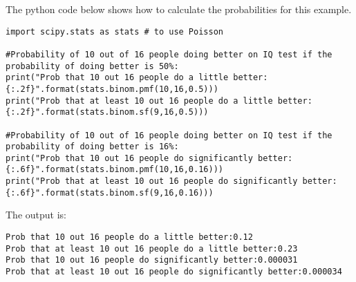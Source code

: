 The python code below shows how to calculate the probabilities for this example.
\begin{lstlisting}[frame=single] 
import scipy.stats as stats # to use Poisson

#Probability of 10 out of 16 people doing better on IQ test if the probability of doing better is 50%:
print("Prob that 10 out 16 people do a little better:{:.2f}".format(stats.binom.pmf(10,16,0.5)))
print("Prob that at least 10 out 16 people do a little better:{:.2f}".format(stats.binom.sf(9,16,0.5)))

#Probability of 10 out of 16 people doing better on IQ test if the probability of doing better is 16%:
print("Prob that 10 out 16 people do significantly better:{:.6f}".format(stats.binom.pmf(10,16,0.16)))
print("Prob that at least 10 out 16 people do significantly better:{:.6f}".format(stats.binom.sf(9,16,0.16)))
\end{lstlisting}
The output is:
\begin{verbatim}
Prob that 10 out 16 people do a little better:0.12
Prob that at least 10 out 16 people do a little better:0.23
Prob that 10 out 16 people do significantly better:0.000031
Prob that at least 10 out 16 people do significantly better:0.000034
\end{verbatim}

